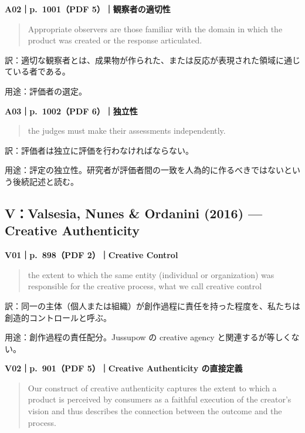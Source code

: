 \documentclass[
  11pt,
  a4paper,
]{article}
\begin{document}

\textbf{A02｜p.~1001（PDF 5）｜観察者の適切性}

\begin{quote}
Appropriate observers are those familiar with the domain in which the
product was created or the response articulated.
\end{quote}

訳：適切な観察者とは、成果物が作られた、または反応が表現された領域に通じている者である。

用途：評価者の選定。


\textbf{A03｜p.~1002（PDF 6）｜独立性}

\begin{quote}
the judges must make their assessments independently.
\end{quote}

訳：評価者は独立に評価を行わなければならない。

用途：評定の独立性。研究者が評価者間の一致を人為的に作るべきではないという後続記述と読む。

\subsection{V：Valsesia, Nunes \& Ordanini (2016) --- Creative
Authenticity}\label{vvalsesia-nunes-ordanini-2016-creative-authenticity}


\textbf{V01｜p.~898（PDF 2）｜Creative Control}

\begin{quote}
the extent to which the same entity (individual or organization) was
responsible for the creative process, what we call creative control
\end{quote}

訳：同一の主体（個人または組織）が創作過程に責任を持った程度を、私たちは創造的コントロールと呼ぶ。

用途：創作過程の責任配分。Jussupow の creative agency
と関連するが等しくない。


\textbf{V02｜p.~901（PDF 5）｜Creative Authenticity の直接定義}

\begin{quote}
Our construct of creative authenticity captures the extent to which a
product is perceived by consumers as a faithful execution of the
creator's vision and thus describes the connection between the outcome
and the process.
\end{quote}
\end{document}

